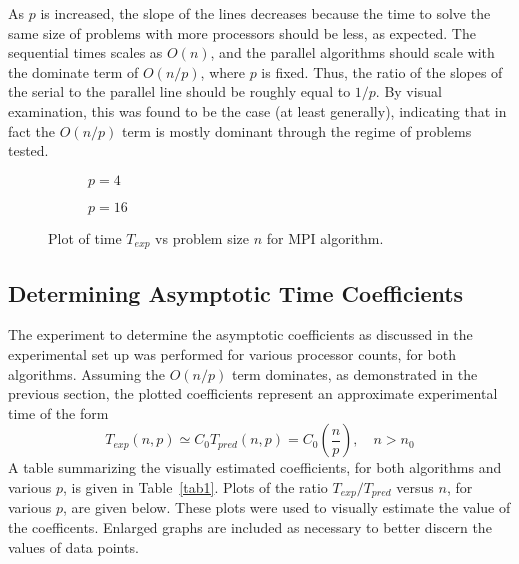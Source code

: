 \documentclass[12pt]{article}
\begin{document}
{{{As $p$ is increased, the slope of the lines decreases because the time to solve the
same size of problems with more processors should be less, as expected.
The sequential times scales as $O(n)$, and the parallel algorithms should scale with
the dominate term of $O(n/p)$, where $p$ is fixed.  Thus, the ratio of the slopes of the
serial to the parallel line should be roughly equal to $1/p$.  By visual examination, this was found to be the
case (at least generally), indicating that in fact the $O(n/p)$ term is mostly
dominant through the regime of problems tested. 

     \begin{figure}[htbp!]
         \begin{subfigure}{0.5\textwidth}
         \centering
           \caption{$p=4$ \label{mpin4}}
     \end{subfigure}
     \begin{subfigure}{0.5\textwidth}
           \centering
           \caption{$p=16$ \label{mpin16}}
       \end{subfigure}
        \caption{Plot of time $T_{exp}$ vs problem size $n$ for MPI
           algorithm.\label{mpin}}
     \end{figure}


\clearpage
\subsection{Determining Asymptotic Time Coefficients}

The experiment to determine the asymptotic coefficients as discussed in the
experimental set up was performed for various processor counts, for both algorithms.
Assuming the $O(n/p)$ term dominates, as demonstrated in the previous section, the plotted coefficients represent an
approximate experimental time of the form
\begin{equation}
    T_{exp}(n,p) \simeq C_{0}T_{pred}(n,p) = C_{0}\left(\frac{n}{p}\right), \quad n>n_0
    \label{duh}
\end{equation}
A table summarizing the visually estimated coefficients, for both algorithms and various $p$,  is
given in Table~\ref{tab1}. Plots of the ratio $T_{exp}/T_{pred}$ versus $n$, for
various $p$, are given below.  These plots were used to visually estimate the value
of the coefficents.  Enlarged graphs are included as necessary to 
better discern the values of data points.

}}}
\end{document}
